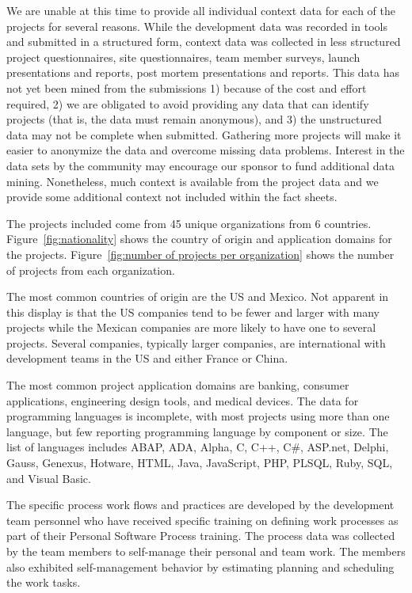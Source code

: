 \documentclass[smallcondensed]{svjour3}
\newcommand{\fig}[1]{Figure~\ref{fig:#1}}
\begin{document}
We are unable at this time to provide all individual context data for each of the projects for several reasons. While the development data was recorded in tools and submitted in a structured form, context data was collected in less structured project questionnaires, site questionnaires, team member surveys, launch presentations and reports, post mortem presentations and reports. This data has not yet been mined from the submissions 1) because of the cost and effort required, 2) we are obligated to avoid providing any data that can identify projects (that is, the data must remain anonymous), and 3) the unstructured data may not be complete when submitted.   Gathering more projects will make it easier to anonymize the data and overcome missing data problems. Interest in the data sets by the community may encourage our sponsor to fund additional data mining.  Nonetheless, much context is available from the project data  and we provide some additional context not included within the fact sheets. 
 
 The projects included come from 45 unique organizations from 6 countries. \fig{nationality} shows the country of origin and application domains for the projects.  \fig{number of projects per organization} shows the number of projects from each organization. 
 
The most common countries of origin are the US and Mexico. Not apparent in this display is that the US companies tend to be fewer and larger with many projects while the Mexican companies are more likely to have one to several projects. Several companies, typically larger companies, are international with development teams in the US and either France or China. 

The most common project application domains are banking, consumer applications, engineering design tools, and medical devices.   
The data for programming languages is incomplete, with most projects using more than one language, but few reporting  programming language by component or size.  The list of languages includes ABAP, ADA, Alpha, C, C++, C\#, ASP.net, Delphi, Gauss, Genexus, Hotware, HTML, Java, JavaScript, PHP, PLSQL, Ruby, SQL, and Visual Basic. 
 

 The specific process work flows and practices are developed by the development team personnel who have received specific training on defining work processes as part of their Personal Software Process training. The process data was collected by the team members to self-manage their personal and team work. The members also exhibited self-management behavior by estimating planning and scheduling the work tasks. 
\end{document}

